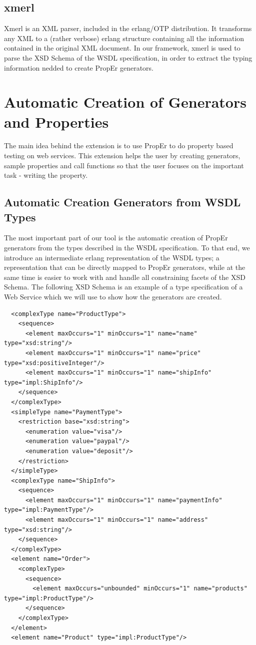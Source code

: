 \documentclass[submission,copyright,a4]{eptcs}
\begin{document}
\subsection{xmerl}

Xmerl is an XML parser, included in the erlang/OTP distribution. It transforms any XML to a (rather verbose) erlang structure containing all the information contained in the original XML document. In our framework, xmerl is used to parse the XSD Schema of the WSDL specification, in order to extract the typing information nedded to create PropEr generators.

\section{Automatic Creation of Generators and Properties}

The main idea behind the extension is to use PropEr to do property based testing on web services. This extension helps the user by creating generators, sample properties and call functions so that the user focuses on the important task - writing the property. 

\subsection{Automatic Creation Generators from WSDL Types}

The most important part of our tool is the automatic creation of PropEr generators from the types described in the WSDL specification. To that end, we introduce an intermediate erlang representation of the WSDL types; a representation that can be directly mapped to PropEr generators, while at the same time is easier to work with and handle all constraining facets of the XSD Schema. The following XSD Schema is an example of a type specification of a Web Service which we will use to show how the generators are created.

\begin{lstlisting}
  <complexType name="ProductType">
    <sequence>
      <element maxOccurs="1" minOccurs="1" name="name" type="xsd:string"/>
      <element maxOccurs="1" minOccurs="1" name="price" type="xsd:positiveInteger"/>
      <element maxOccurs="1" minOccurs="1" name="shipInfo" type="impl:ShipInfo"/>
    </sequence>
  </complexType>
  <simpleType name="PaymentType">
    <restriction base="xsd:string">
      <enumeration value="visa"/>
      <enumeration value="paypal"/>
      <enumeration value="deposit"/>
    </restriction>
  </simpleType>
  <complexType name="ShipInfo">
    <sequence>
      <element maxOccurs="1" minOccurs="1" name="paymentInfo" type="impl:PaymentType"/>
      <element maxOccurs="1" minOccurs="1" name="address" type="xsd:string"/>
    </sequence>
  </complexType>
  <element name="Order">
    <complexType>
      <sequence>
        <element maxOccurs="unbounded" minOccurs="1" name="products" type="impl:ProductType"/>
      </sequence>
    </complexType>
  </element>
  <element name="Product" type="impl:ProductType"/>
\end{lstlisting}
\end{document}
